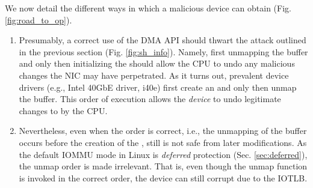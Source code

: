 We now detail the different ways in which a malicious device can obtain \oportunity{} (Fig. \ref{fig:road_to_op}).

\begin{enumerate}[label=(\roman*)]

\item Presumably, a correct use of the DMA API should thwart the attack outlined in the previous section (Fig. \ref{fig:sh_info}). Namely, first unmapping the buffer and only then initializing the \shinfo{} should allow the CPU to undo any malicious changes the NIC may have perpetrated. 
As it turns out, prevalent device drivers (e.g., Intel 40GbE driver, i40e) first create an \skb{} and only then unmap the buffer. This order of execution allows the \emph{device} to undo legitimate changes to \shinfo{} by the CPU. 

\item Nevertheless, even when the order is correct, i.e., the unmapping of the buffer occurs before the creation of the \skb{}, still \shinfo{} is not safe from later modifications. As the default IOMMU mode in Linux is \emph{deferred} protection (Sec. \ref{sec:deferred}), the unmap order is made irrelevant. That is, even though the unmap function is invoked in the correct order, the device can still corrupt \shinfo{} due to the IOTLB.


\end{enumerate}
